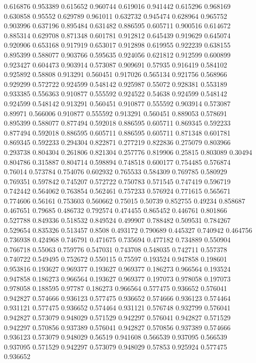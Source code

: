 0.616876 0.953389
0.615652 0.960744
0.619016 0.941442
0.615296 0.968169
0.630858 0.95552
0.629789 0.961011
0.632732 0.945474
0.628964 0.965752
0.903996 0.637196
0.895484 0.631482
0.886595 0.605711
0.900516 0.614672
0.885314 0.629708
0.871348 0.601781
0.912812 0.645439
0.919629 0.645074
0.920906 0.653168
0.917919 0.653017
0.912898 0.619955
0.922239 0.638155
0.895399 0.588077
0.903766 0.595635
0.924056 0.621812
0.912599 0.600899
0.923427 0.604473
0.903914 0.573087
0.909691 0.57935
0.916419 0.584102
0.925892 0.58808
0.913291 0.560451
0.917026 0.565134
0.921756 0.568966
0.929299 0.572722
0.924599 0.548142
0.925987 0.55072
0.928381 0.553189
0.933385 0.556363
0.910877 0.555592
0.924522 0.54638
0.924599 0.548142
0.924599 0.548142
0.913291 0.560451
0.910877 0.555592
0.903914 0.573087
0.89971 0.566006
0.910877 0.555592
0.913291 0.560451
0.889053 0.578691
0.895399 0.588077
0.877494 0.592018
0.886595 0.605711
0.869345 0.592233
0.877494 0.592018
0.886595 0.605711
0.886595 0.605711
0.871348 0.601781
0.869345 0.592233
0.294304 0.822871
0.277219 0.822836
0.275079 0.803966
0.293738 0.804304
0.261806 0.821304
0.257776 0.819906
0.25815 0.803089
0.30494 0.804786
0.315887 0.804714
0.598894 0.748518
0.600177 0.754485
0.576874 0.76014
0.573784 0.754076
0.602932 0.765533
0.584309 0.769785
0.580929 0.769351
0.597842 0.745207
0.572722 0.750783
0.571545 0.747419
0.596719 0.742442
0.564062 0.763854
0.562461 0.757233
0.576924 0.771615
0.565671 0.774606
0.56161 0.753603
0.560662 0.75015
0.50739 0.852755
0.49234 0.858687
0.467651 0.79685
0.486732 0.792574
0.474455 0.865452
0.446761 0.801866
0.527788 0.849336
0.518532 0.849524
0.499907 0.788482
0.509531 0.784267
0.529654 0.835326
0.513457 0.8508
0.493172 0.790689
0.445327 0.740942
0.464756 0.736938
0.424968 0.746791
0.471675 0.735694
0.477182 0.734889
0.550904 0.766718
0.55063 0.759776
0.547031 0.743708
0.548035 0.742711
0.557378 0.740722
0.549495 0.752672
0.550115 0.75597
0.193524 0.947858
0.198601 0.953816
0.193627 0.969377
0.193627 0.969377
0.186273 0.966564
0.193524 0.947858
0.186273 0.966564
0.193627 0.969377
0.197073 0.978058
0.197073 0.978058
0.188595 0.97787
0.186273 0.966564
0.577475 0.936652
0.576041 0.942827
0.574666 0.936123
0.577475 0.936652
0.574666 0.936123
0.574464 0.931121
0.577475 0.936652
0.574464 0.931121
0.576748 0.932799
0.576041 0.942827
0.573079 0.948029
0.571529 0.942297
0.576041 0.942827
0.571529 0.942297
0.570856 0.937389
0.576041 0.942827
0.570856 0.937389
0.574666 0.936123
0.573079 0.948029
0.56519 0.941608
0.566539 0.937095
0.566539 0.937095
0.571529 0.942297
0.573079 0.948029
0.57853 0.925924
0.577475 0.936652

